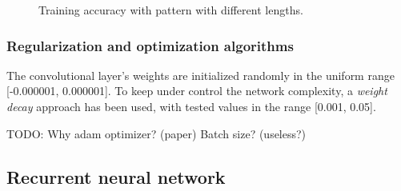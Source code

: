 \begin{center}
	\begin{figure}[ht]
		\caption{Training accuracy with pattern with different lengths.}
	\end{figure}
\end{center}

\subsubsection{Regularization and optimization algorithms}
The convolutional layer's weights are initialized randomly in the uniform range [-0.000001, 0.000001]. To keep under control the network complexity, a \textit{weight decay} approach has been used, with tested values in the range [0.001, 0.05].
\bigbreak

TODO: Why adam optimizer? (paper) Batch size? (useless?)

\subsection{Recurrent neural network}
